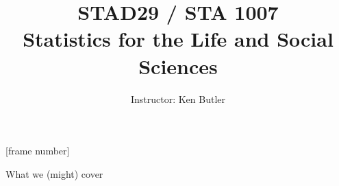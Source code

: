 \usepackage{graphicx}
\usepackage{hyperref}
\usepackage{lastpage}
\usepackage{multicol}


\title[STAD29/STA1007]{STAD29 / STA 1007\\Statistics for the Life and Social Sciences}
\author[Ken Butler]{Instructor: Ken Butler}

    \usenavigationsymbolstemplate{} 
    [frame number]
    \beamersetleftmargin{.2in}
    \beamersetrightmargin{.2in}

%
%
%
%
%
%





\begin{frame}
  \titlepage
\end{frame}



\begin{frame}{What we (might) cover}
  \tableofcontents
\end{frame}



















%


